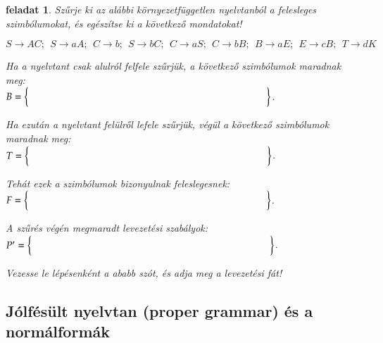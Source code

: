 \documentclass[a4paper]{article}
\newtheorem{feladat}{feladat}[section]
\begin{document}
\begin{feladat}{43}
Szűrje ki az alábbi környezetfüggetlen nyelvtanból a felesleges
szimbólumokat, és egészítse ki a következő mondatokat!

\vspace{2em}
\[ S\rightarrow AC;\:\: S\rightarrow aA;\:\: C\rightarrow
b;\:\: S\rightarrow bC;\:\: C\rightarrow aS;\:\: C\rightarrow bB;\:\:
B\rightarrow aE;\:\: E\rightarrow cB;\:\: T\rightarrow dK \]

Ha a nyelvtant csak alulról felfele szűrjük, a következő szimbólumok
maradnak meg:\\
$B=\left\{\rule{0pt}{1.2em}\hspace{.7\linewidth}\right\}$.

Ha ezután a nyelvtant felülről lefele szűrjük, végül a következő szimbólumok
maradnak meg:\\
$T=\left\{\rule{0pt}{1.2em}\hspace{.7\linewidth}\right\}$.

Tehát ezek a szimbólumok bizonyulnak feleslegesnek:\\
$F=\left\{\rule{0pt}{1.2em}\hspace{.7\linewidth}\right\}$.

A szűrés végén megmaradt levezetési szabályok:\\[1ex]
$P'=\left\{\rule{0pt}{1.2em}\hspace{.7\linewidth}\right\}$.

Vezesse le lépésenként a ababb szót, és adja meg a levezetési
fát!
\end{feladat}
\vfill
\newpage

\subsection{Jólfésült nyelvtan (proper grammar) és a normálformák}
\end{document}
